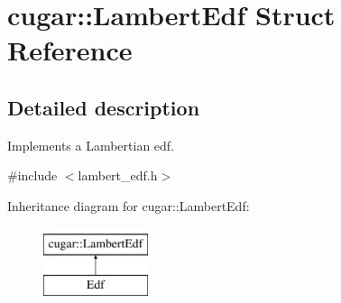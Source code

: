 \hypertarget{structcugar_1_1_lambert_edf}{}\section{cugar\+:\+:Lambert\+Edf Struct Reference}
\label{structcugar_1_1_lambert_edf}


\subsection{Detailed description}
Implements a Lambertian edf. 

{\ttfamily \#include $<$lambert\+\_\+edf.\+h$>$}

Inheritance diagram for cugar\+:\+:Lambert\+Edf\+:\begin{figure}[H]
\begin{center}
\leavevmode
\includegraphics[height=2.000000cm]{structcugar_1_1_lambert_edf}
\end{center}
\end{figure}
